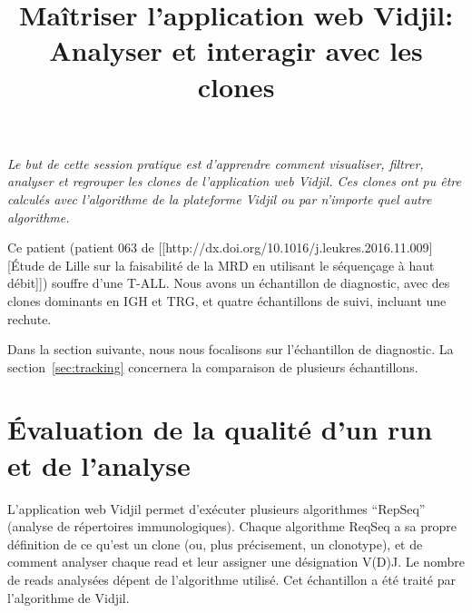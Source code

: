 \documentclass[10pt]{article}
\title{Maîtriser l'application web Vidjil:\\ Analyser et interagir avec les  clones
}
\begin{document}
\maketitle

  \textit{Le but de cette session pratique est d'apprendre comment
  visualiser, filtrer, analyser et regrouper les clones de l'application web
  Vidjil. %
Ces clones ont pu être calculés avec l'algorithme de la plateforme Vidjil ou par n'importe
quel autre algorithme.}

\bigskip


Ce patient (patient 063 de [[http://dx.doi.org/10.1016/j.leukres.2016.11.009][Étude de Lille sur la faisabilité de la MRD en utilisant le séquençage à haut débit]])
souffre d'une T-ALL. Nous avons un échantillon de diagnostic,
avec des clones dominants en IGH et TRG,
et quatre échantillons de suivi, incluant une rechute.


Dans la section suivante, nous nous focalisons sur l'échantillon de diagnostic.
La section~\ref{sec:tracking} concernera la comparaison de plusieurs échantillons.



\section{Évaluation de la qualité d'un run et de l'analyse}
L'application web Vidjil permet d'exécuter plusieurs algorithmes ``RepSeq'' (analyse de répertoires immunologiques).
Chaque algorithme ReqSeq a sa propre définition de ce qu'est un clone
(ou, plus précisement, un clonotype),
et de comment analyser chaque read et leur assigner une désignation V(D)J.
Le nombre de reads analysées dépent de l'algorithme utilisé.
Cet échantillon a été traité par l'algorithme de Vidjil.


\end{document}
